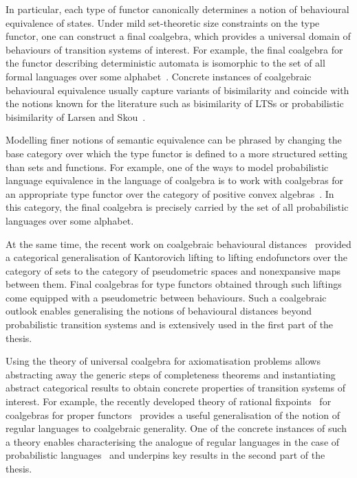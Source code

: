 In particular, each type of functor canonically determines a notion of behavioural equivalence of states. Under mild set-theoretic size constraints on the type functor, one can construct a final coalgebra, which provides a universal domain of behaviours of transition systems of interest. For example, the final coalgebra for the functor describing deterministic automata is isomorphic to the set of all formal languages over some alphabet~\cite{Rutten:2000:Universal}. Concrete instances of coalgebraic behavioural equivalence usually capture variants of bisimilarity and coincide with the notions known for the literature such as bisimilarity of LTSs or probabilistic bisimilarity of Larsen and Skou~\cite{Vink:1999:Bisimulation}.  
		
	Modelling finer notions of semantic equivalence can be phrased by changing the base category over which the type functor is defined to a more structured setting than sets and functions. For example, one of the ways to model probabilistic language equivalence in the language of coalgebra is to work with coalgebras for an appropriate type functor over the category of positive convex algebras~\cite{Silva:2010:Generalizing,Silva:2011:Sound}. In this category, the final coalgebra is precisely carried by the set of all probabilistic languages over some alphabet. 	 

At the same time, the recent work on coalgebraic behavioural distances~\cite{Baldan:2018:Coalgebraic} provided a categorical generalisation of Kantorovich lifting to lifting endofunctors over the category of sets to the category of pseudometric spaces and nonexpansive maps between them. Final coalgebras for type functors obtained through such liftings come equipped with a pseudometric between behaviours. Such a coalgebraic outlook enables generalising the notions of behavioural distances beyond probabilistic transition systems and is extensively used in the first part of the thesis.

Using the theory of universal coalgebra for axiomatisation problems allows abstracting away the generic steps of completeness theorems and instantiating abstract categorical results to obtain concrete properties of transition systems of interest. For example, the recently developed theory of rational fixpoints~\cite{Milius:2010:Sound} for coalgebras for proper functors~\cite{Milius:2018:Proper} provides a useful generalisation of the notion of regular languages to coalgebraic generality. One of the concrete instances of such a theory enables characterising the analogue of regular languages in the case of probabilistic languages~\cite{Sokolova:2018:Proper} and underpins key results in the second part of the thesis.


